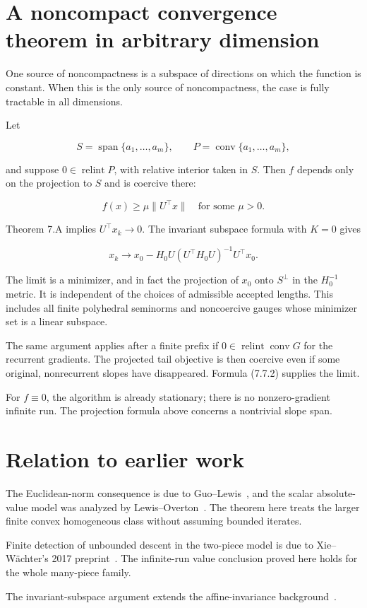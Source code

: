 \setcounter{section}{7}
\setcounter{theorem}{0}
\setcounter{lemma}{0}
\setcounter{corollary}{0}
\setcounter{proposition}{0}
\setcounter{remark}{0}
\setcounter{equation}{0}


\section{A noncompact convergence theorem in arbitrary
dimension}\label{H:a-noncompact-convergence-theorem-in-arbitrary-dimension}


One source of noncompactness is a subspace of directions on which the
function is constant. When this is the only source of noncompactness,
the case is fully tractable in all dimensions.

Let

\[
S=\operatorname{span}\{a_1,\ldots,a_m\},\qquad
P=\operatorname{conv}\{a_1,\ldots,a_m\},
\]

and suppose \(0\in\operatorname{relint}P\), with relative interior taken
in \(S\). Then \(f\) depends only on the projection to \(S\) and is
coercive there:

\[
f(x)\ge\mu\|U^\top x\|\quad\text{for some }\mu>0.
\]

Theorem 7.A implies \(U^\top x_k\to0\). The invariant subspace formula
with \(K=0\) gives

\[
\boxed{
x_k\longrightarrow
x_0-H_0U(U^\top H_0U)^{-1}U^\top x_0.
}
\tag{7.8.1}
\]

The limit is a minimizer, and in fact the projection of \(x_0\) onto
\(S^\perp\) in the \(H_0^{-1}\) metric. It is independent of the choices
of admissible accepted lengths. This includes all finite polyhedral
seminorms and noncoercive gauges whose minimizer set is a linear
subspace.

The same argument applies after a finite prefix if
\(0\in\operatorname{relint}\operatorname{conv}G\) for the recurrent
gradients. The projected tail objective is then coercive even if some
original, nonrecurrent slopes have disappeared. Formula (7.7.2) supplies
the limit.

For \(f\equiv0\), the algorithm is already stationary; there is no
nonzero-gradient infinite run. The projection formula above concerns a
nontrivial slope span.


\endgroup


\section*{Relation to earlier work}
The Euclidean-norm consequence is due to Guo--Lewis~\cite[Corollary~4.2]{GL18}, and the scalar absolute-value model was analyzed by Lewis--Overton~\cite[Section~5.1]{LO}. The theorem here treats the larger finite convex homogeneous class without assuming bounded iterates.

Finite detection of unbounded descent in the two-piece model is due to Xie--W\"achter's 2017 preprint~\cite[Theorem~IV.1]{XW}. The infinite-run value conclusion proved here holds for the whole many-piece family.

The invariant-subspace argument extends the affine-invariance background~\cite[Theorem~II.1]{XW}.
